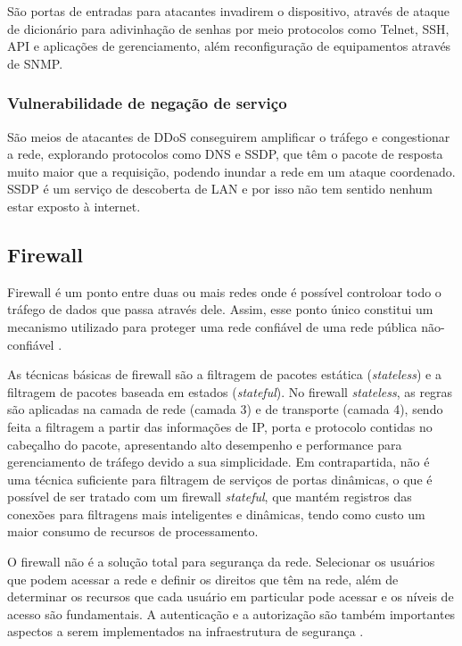     São portas de entradas para atacantes invadirem o dispositivo, através de ataque de dicionário para adivinhação de senhas por meio protocolos como Telnet, SSH, API e aplicações de gerenciamento, além reconfiguração de equipamentos através de SNMP.

\subsubsection{Vulnerabilidade de negação de serviço}

    São meios de atacantes de DDoS conseguirem amplificar o tráfego e congestionar a rede, explorando protocolos como DNS e SSDP, que têm o pacote de resposta muito maior que a requisição, podendo inundar a rede em um ataque coordenado. SSDP é um serviço de descoberta de LAN e por isso não tem sentido nenhum estar exposto à internet.

\subsection{Firewall}

    Firewall é um ponto entre duas ou mais redes onde é possível controloar todo o tráfego de dados que passa através dele. Assim, esse ponto único constitui um mecanismo utilizado para proteger uma rede confiável de uma rede pública não-confiável \cite{nakamura2007}.
    
    As técnicas básicas de firewall são a filtragem de pacotes estática (\textit{stateless}) e a filtragem de pacotes baseada em estados (\textit{stateful}). No firewall \textit{stateless}, as regras são aplicadas na camada de rede (camada 3) e de transporte (camada 4), sendo feita a filtragem a partir das informações de IP, porta e protocolo contidas no cabeçalho do pacote, apresentando alto desempenho e performance para gerenciamento de tráfego devido a sua simplicidade. Em contrapartida, não é uma técnica suficiente para filtragem de serviços de portas dinâmicas, o que é possível de ser tratado com um firewall \textit{stateful}, que mantém registros das conexões para filtragens mais inteligentes e dinâmicas, tendo como custo um maior consumo de recursos de processamento.
    
    O firewall não é a solução total para segurança da rede. Selecionar os usuários que podem acessar a rede e definir os direitos que têm na rede, além de determinar os recursos que cada usuário em particular pode acessar e os níveis de acesso são fundamentais. A autenticação e a autorização são também importantes aspectos a serem implementados na infraestrutura de segurança \cite{nakamura2007}.

